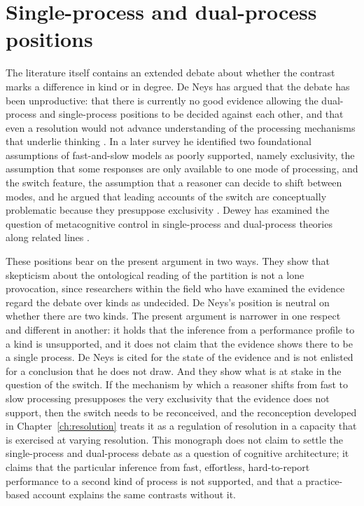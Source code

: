 \documentclass[11pt]{report}
\theoremstyle{remark}
\theoremstyle{definition}
\begin{document}
\section{Single-process and dual-process positions}

The literature itself contains an extended debate about whether the contrast marks a difference in kind or in degree. De Neys has argued that the debate has been unproductive: that there is currently no good evidence allowing the dual-process and single-process positions to be decided against each other, and that even a resolution would not advance understanding of the processing mechanisms that underlie thinking \cite{deneys2021}. In a later survey he identified two foundational assumptions of fast-and-slow models as poorly supported, namely exclusivity, the assumption that some responses are only available to one mode of processing, and the switch feature, the assumption that a reasoner can decide to shift between modes, and he argued that leading accounts of the switch are conceptually problematic because they presuppose exclusivity \cite{deneys2023}. Dewey has examined the question of metacognitive control in single-process and dual-process theories along related lines \cite{dewey2022}.

These positions bear on the present argument in two ways. They show that skepticism about the ontological reading of the partition is not a lone provocation, since researchers within the field who have examined the evidence regard the debate over kinds as undecided. De Neys's position is neutral on whether there are two kinds. The present argument is narrower in one respect and different in another: it holds that the inference from a performance profile to a kind is unsupported, and it does not claim that the evidence shows there to be a single process. De Neys is cited for the state of the evidence and is not enlisted for a conclusion that he does not draw. And they show what is at stake in the question of the switch. If the mechanism by which a reasoner shifts from fast to slow processing presupposes the very exclusivity that the evidence does not support, then the switch needs to be reconceived, and the reconception developed in Chapter~\ref{ch:resolution} treats it as a regulation of resolution in a capacity that is exercised at varying resolution. This monograph does not claim to settle the single-process and dual-process debate as a question of cognitive architecture; it claims that the particular inference from fast, effortless, hard-to-report performance to a second kind of process is not supported, and that a practice-based account explains the same contrasts without it.
\end{document}
